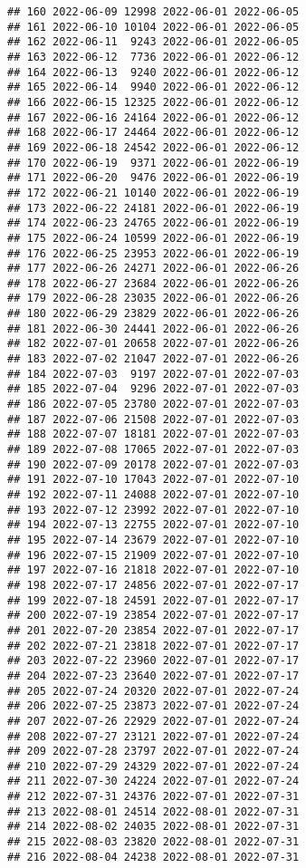 \documentclass[
]{article}
\begin{document}
\begin{verbatim}
## 160 2022-06-09 12998 2022-06-01 2022-06-05
## 161 2022-06-10 10104 2022-06-01 2022-06-05
## 162 2022-06-11  9243 2022-06-01 2022-06-05
## 163 2022-06-12  7736 2022-06-01 2022-06-12
## 164 2022-06-13  9240 2022-06-01 2022-06-12
## 165 2022-06-14  9940 2022-06-01 2022-06-12
## 166 2022-06-15 12325 2022-06-01 2022-06-12
## 167 2022-06-16 24164 2022-06-01 2022-06-12
## 168 2022-06-17 24464 2022-06-01 2022-06-12
## 169 2022-06-18 24542 2022-06-01 2022-06-12
## 170 2022-06-19  9371 2022-06-01 2022-06-19
## 171 2022-06-20  9476 2022-06-01 2022-06-19
## 172 2022-06-21 10140 2022-06-01 2022-06-19
## 173 2022-06-22 24181 2022-06-01 2022-06-19
## 174 2022-06-23 24765 2022-06-01 2022-06-19
## 175 2022-06-24 10599 2022-06-01 2022-06-19
## 176 2022-06-25 23953 2022-06-01 2022-06-19
## 177 2022-06-26 24271 2022-06-01 2022-06-26
## 178 2022-06-27 23684 2022-06-01 2022-06-26
## 179 2022-06-28 23035 2022-06-01 2022-06-26
## 180 2022-06-29 23829 2022-06-01 2022-06-26
## 181 2022-06-30 24441 2022-06-01 2022-06-26
## 182 2022-07-01 20658 2022-07-01 2022-06-26
## 183 2022-07-02 21047 2022-07-01 2022-06-26
## 184 2022-07-03  9197 2022-07-01 2022-07-03
## 185 2022-07-04  9296 2022-07-01 2022-07-03
## 186 2022-07-05 23780 2022-07-01 2022-07-03
## 187 2022-07-06 21508 2022-07-01 2022-07-03
## 188 2022-07-07 18181 2022-07-01 2022-07-03
## 189 2022-07-08 17065 2022-07-01 2022-07-03
## 190 2022-07-09 20178 2022-07-01 2022-07-03
## 191 2022-07-10 17043 2022-07-01 2022-07-10
## 192 2022-07-11 24088 2022-07-01 2022-07-10
## 193 2022-07-12 23992 2022-07-01 2022-07-10
## 194 2022-07-13 22755 2022-07-01 2022-07-10
## 195 2022-07-14 23679 2022-07-01 2022-07-10
## 196 2022-07-15 21909 2022-07-01 2022-07-10
## 197 2022-07-16 21818 2022-07-01 2022-07-10
## 198 2022-07-17 24856 2022-07-01 2022-07-17
## 199 2022-07-18 24591 2022-07-01 2022-07-17
## 200 2022-07-19 23854 2022-07-01 2022-07-17
## 201 2022-07-20 23854 2022-07-01 2022-07-17
## 202 2022-07-21 23818 2022-07-01 2022-07-17
## 203 2022-07-22 23960 2022-07-01 2022-07-17
## 204 2022-07-23 23640 2022-07-01 2022-07-17
## 205 2022-07-24 20320 2022-07-01 2022-07-24
## 206 2022-07-25 23873 2022-07-01 2022-07-24
## 207 2022-07-26 22929 2022-07-01 2022-07-24
## 208 2022-07-27 23121 2022-07-01 2022-07-24
## 209 2022-07-28 23797 2022-07-01 2022-07-24
## 210 2022-07-29 24329 2022-07-01 2022-07-24
## 211 2022-07-30 24224 2022-07-01 2022-07-24
## 212 2022-07-31 24376 2022-07-01 2022-07-31
## 213 2022-08-01 24514 2022-08-01 2022-07-31
## 214 2022-08-02 24035 2022-08-01 2022-07-31
## 215 2022-08-03 23820 2022-08-01 2022-07-31
## 216 2022-08-04 24238 2022-08-01 2022-07-31

\end{verbatim}
\end{document}
